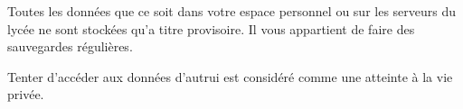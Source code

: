 \documentclass[11pt,oneside]{article}
\begin{document}

\begin{warn}

Toutes les données que ce soit dans votre espace personnel ou sur les serveurs du lycée ne sont stockées qu'a titre provisoire. Il vous appartient de faire des sauvegardes régulières.
\end{warn}


\begin{warn}

Tenter d'accéder aux données d'autrui est considéré comme une atteinte à la vie privée.
\end{warn}

\end{document}
